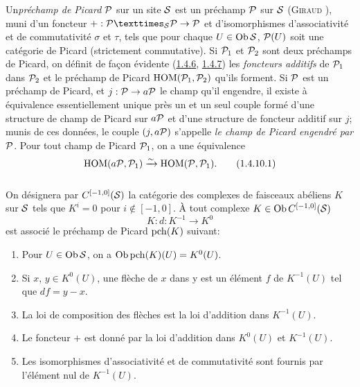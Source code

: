 \documentclass[10pt]{../fichiers-configuration-latex/smfart}
\begin{document}
\subsubsection{}
Un\pageoriginale \emph{préchamp de Picard} ${\mathcal P}$ sur un site
${\mathcal S}$ est un préchamp ${\mathcal P}$ sur ${\mathcal S}$ (\textsc{Giraud}
\cite{SGA4-18:1}), muni d'un foncteur
$+:\fprod{\Pp}{\Pp}{\Ss}\rightarrow \Pp$ et
d'isomorphismes d'associativité et de commutativité $\sigma$ et
$\tau$, tels que pour chaque $U\in \operatorname{Ob} {\mathcal S}$, ${\mathcal P}(U)$
soit une catégorie de Picard (strictement commutative). Si
${\mathcal P}_{1}$ et ${\mathcal P}_{2}$ sont deux préchamps de Picard,
on définit de façon évidente (\cf \hyperref[XVIII.subsubsec1.4.6]{1.4.6},
\hyperref[XVIII.subsubsec1.4.7]{1.4.7}) les \emph{foncteurs 
additifs} de ${\mathcal P}_{1}$ dans ${\mathcal P}_{2}$ et le préchamp
de Picard $\operatorname{HOM}({\mathcal P}_{1}, {\mathcal P}_{2})$ qu'ils forment. Si
${\mathcal P}$ est un préchamp de Picard, et $j:{\mathcal P}\rightarrow
a{\mathcal P}$ le champ qu'il engendre, il existe à équivalence
essentiellement unique près un et un seul couple formé d'une structure
de champ de Picard sur $a{\mathcal P}$ et d'une structure de foncteur
additif sur $j$; munis de ces données, le couple $(j,a{\mathcal P})$
s'appelle \emph{le champ de Picard engendré par} ${\mathcal P}$. Pour
tout champ de Picard ${\mathcal P}_{1}$, on a une équivalence
\begin{equation*}
\operatorname{HOM}(a{\mathcal P},{\mathcal P}_{1})\xrightarrow{\sim} \operatorname{HOM}({\mathcal P},{\mathcal P}_{1}){}.\tag{1.4.10.1}
\end{equation*}

\subsubsection{}
On désignera par $C^{[-1,0]}({\mathcal S})$ la catégorie des complexes
de faisceaux abéliens $K$ sur ${\mathcal S}$ tels que $K^{i}=0$ pour
$i\not\in [-1,0]$. À tout complexe $K\in \operatorname{Ob} C^{[-1,0]}({\mathcal S})$
$$
K:d:K^{-1}\longrightarrow K^{0}
$$
est associé le préchamp de Picard $\operatorname{pch}(K)$ suivant:

\begin{enumerate}
\renewcommand{\theenumi}{\Roman{enumi}}
\renewcommand{\labelenumi}{(\theenumi)}
\item Pour $U\in \operatorname{Ob} {\mathcal S}$, on a $\operatorname{Ob} \operatorname{pch}(K)(U)=K^{0}(U)$.

\item Si $x$, $y\in K^{0}(U)$, une flèche de $x$ dans y est un élément
$f$ de $K^{-1}(U)$ tel que $df=y-x$.

\item La loi de composition des flèches est la loi d'addition dans
$K^{-1}(U)$.

\item Le foncteur $+$ est donné par la loi d'addition dans $K^{0}(U)$
et $K^{-1}(U)$.

\item Les isomorphismes d'associativité et de commutativité sont
fournis par l'élément nul de $K^{-1}(U)$.
\end{enumerate}
\end{document}
